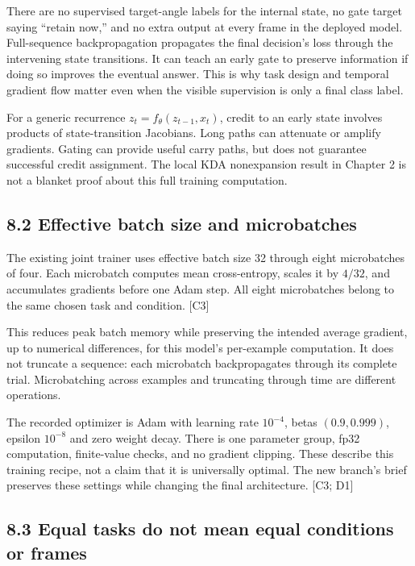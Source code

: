 \documentclass[
  11pt,
]{article}
\newcounter{none} %
\let\oldsubsection\subsection
\renewcommand{\subsection}{\Needspace{6\baselineskip}\oldsubsection}
\begin{document}
There are no supervised target-angle labels for the internal state, no
gate target saying ``retain now,'' and no extra output at every frame in
the deployed model. Full-sequence backpropagation propagates the final
decision's loss through the intervening state transitions. It can teach
an early gate to preserve information if doing so improves the eventual
answer. This is why task design and temporal gradient flow matter even
when the visible supervision is only a final class label.

For a generic recurrence \(z_t=f_\theta(z_{t-1},x_t)\), credit to an
early state involves products of state-transition Jacobians. Long paths
can attenuate or amplify gradients. Gating can provide useful carry
paths, but does not guarantee successful credit assignment. The local
KDA nonexpansion result in Chapter 2 is not a blanket proof about this
full training computation.

\subsection{8.2 Effective batch size and
microbatches}\label{effective-batch-size-and-microbatches}

The existing joint trainer uses effective batch size 32 through eight
microbatches of four. Each microbatch computes mean cross-entropy,
scales it by \(4/32\), and accumulates gradients before one Adam step.
All eight microbatches belong to the same chosen task and condition.
{[}C3{]}

This reduces peak batch memory while preserving the intended average
gradient, up to numerical differences, for this model's per-example
computation. It does not truncate a sequence: each microbatch
backpropagates through its complete trial. Microbatching across examples
and truncating through time are different operations.

The recorded optimizer is Adam with learning rate \(10^{-4}\), betas
\((0.9,0.999)\), epsilon \(10^{-8}\) and zero weight decay. There is one
parameter group, fp32 computation, finite-value checks, and no gradient
clipping. These describe this training recipe, not a claim that it is
universally optimal. The new branch's brief preserves these settings
while changing the final architecture. {[}C3; D1{]}

\subsection{8.3 Equal tasks do not mean equal conditions or
frames}\label{equal-tasks-do-not-mean-equal-conditions-or-frames}
\end{document}
